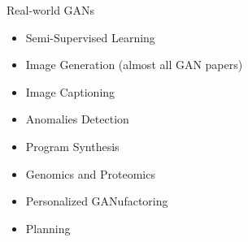 \documentclass{beamer}
\begin{document}
\appendix

\begin{frame}{Real-world GANs }
	\begin{itemize}
		\item Semi-Supervised Learning \citep{salimansImprovedTechniquesTraining2016a}
		\item Image Generation (almost all GAN papers)
		\item Image Captioning
		\item Anomalies Detection \citep{zenatiEfficientGANBasedAnomaly2018a}
		\item Program Synthesis \citep{ganinSynthesizingProgramsImages2018}
		\item Genomics and Proteomics \citep{killoranGeneratingDesigningDNA2017} \citep{decaoMolGANImplicitGenerative2018}
		\item Personalized GANufactoring \citep{hwangLearningHumanExpertise2018}
		\item Planning
	\end{itemize}
\end{frame}

\begin{frame}[allowframebreaks]
	 
	
\end{frame}
\end{document}
